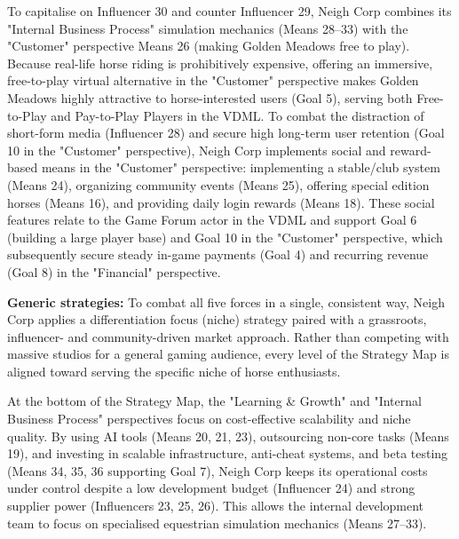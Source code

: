 \documentclass{article}
\begin{document}
To capitalise on Influencer 30 and counter Influencer 29, Neigh Corp combines its "Internal Business Process" simulation mechanics (Means 28--33) with the "Customer" perspective Means 26 (making Golden Meadows free to play). Because real-life horse riding is prohibitively expensive, offering an immersive, free-to-play virtual alternative in the "Customer" perspective makes Golden Meadows highly attractive to horse-interested users (Goal 5), serving both Free-to-Play and Pay-to-Play Players in the VDML. To combat the distraction of short-form media (Influencer 28) and secure high long-term user retention (Goal 10 in the "Customer" perspective), Neigh Corp implements social and reward-based means in the "Customer" perspective: implementing a stable/club system (Means 24), organizing community events (Means 25), offering special edition horses (Means 16), and providing daily login rewards (Means 18). These social features relate to the Game Forum actor in the VDML and support Goal 6 (building a large player base) and Goal 10 in the "Customer" perspective, which subsequently secure steady in-game payments (Goal 4) and recurring revenue (Goal 8) in the "Financial" perspective.

\textbf{Generic strategies:}
To combat all five forces in a single, consistent way, Neigh Corp applies a differentiation focus (niche) strategy paired with a grassroots, influencer- and community-driven market approach. Rather than competing with massive studios for a general gaming audience, every level of the Strategy Map is aligned toward serving the specific niche of horse enthusiasts.

At the bottom of the Strategy Map, the "Learning \& Growth" and "Internal Business Process" perspectives focus on cost-effective scalability and niche quality. By using AI tools (Means 20, 21, 23), outsourcing non-core tasks (Means 19), and investing in scalable infrastructure, anti-cheat systems, and beta testing (Means 34, 35, 36 supporting Goal 7), Neigh Corp keeps its operational costs under control despite a low development budget (Influencer 24) and strong supplier power (Influencers 23, 25, 26). This allows the internal development team to focus on specialised equestrian simulation mechanics (Means 27--33).
\end{document}
